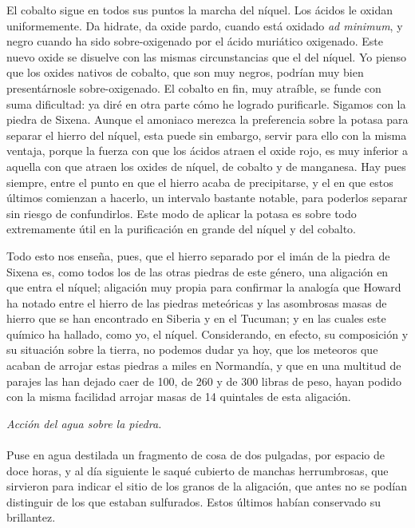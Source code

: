 \documentclass[a4paper, 11pt, oneside, polutonikogreek, spanish]{article}
\begin{document}
El cobalto sigue en todos sus puntos la marcha del níquel. Los ácidos le oxidan uniformemente. Da hidrate, da oxide pardo, cuando está oxidado \emph{ad minimum}, y negro cuando ha sido sobre-oxigenado por el ácido muriático oxigenado. Este nuevo oxide se disuelve con las mismas circunstancias que el del níquel. Yo pienso que los oxides nativos de cobalto, que son muy negros, podrían muy bien presentárnosle sobre-oxigenado. El cobalto en fin, muy atraíble, se funde con suma dificultad: ya diré en otra parte cómo he logrado purificarle. Sigamos con la piedra de Sixena. Aunque el amoniaco merezca la preferencia sobre la potasa para separar el hierro del níquel, esta puede sin embargo, servir para ello con la misma ventaja, porque la fuerza con que los ácidos atraen el oxide rojo, es muy inferior a aquella con que atraen los oxides de níquel, de cobalto y de manganesa. Hay pues siempre, entre el punto en que el hierro acaba de precipitarse, y el en que estos últimos comienzan a hacerlo, un intervalo bastante notable, para poderlos separar sin riesgo de confundirlos. Este modo de aplicar la potasa es sobre todo extremamente útil en la purificación en grande del níquel y del cobalto.

Todo esto nos enseña, pues, que el hierro separado por el imán de la piedra de Sixena es, como todos los de las otras piedras de este género, una aligación en que entra el níquel; aligación muy propia para confirmar la analogía que Howard ha notado entre el hierro de las piedras meteóricas y las asombrosas masas de hierro que se han encontrado en Siberia y en el Tucuman; y en las cuales este químico ha hallado, como yo, el níquel. Considerando, en efecto, su composición y su situación sobre la tierra, no podemos dudar ya hoy, que los meteoros que acaban de arrojar estas piedras a miles en Normandía, y que en una multitud de parajes las han dejado caer de 100, de 260 y de 300 libras de peso, hayan podido con la misma facilidad arrojar masas de 14 quintales de esta aligación.
\begin{center}
\emph{Acción del agua sobre la piedra.}
\end{center}
\paragraph{}
Puse en agua destilada un fragmento de cosa de dos pulgadas, por espacio de doce horas, y al día siguiente le saqué cubierto de manchas herrumbrosas, que sirvieron para indicar el sitio de los granos de la aligación, que antes no se podían distinguir de los que estaban sulfurados. Estos últimos habían conservado su brillantez.
\end{document}
